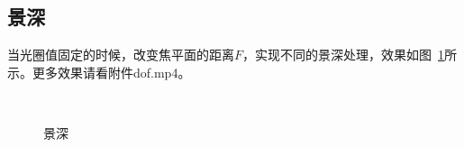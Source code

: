 \documentclass{article}
\begin{document}
\subsection{景深}
当光圈值固定的时候，改变焦平面的距离$F$，实现不同的景深处理，效果如图~\ref{fig:dof}所示。更多效果请看附件dof.mp4。
\begin{figure}[H]
  \centering%
\\
  \caption{景深}
  \label{fig:dof}
\end{figure}
\end{document}
